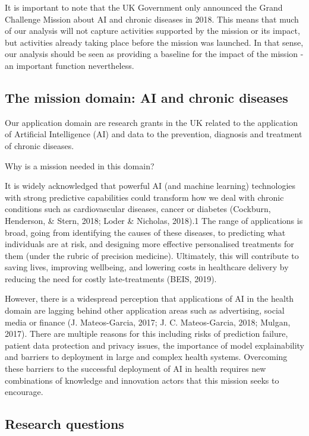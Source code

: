 \documentclass[11pt]{article}
\begin{document}
It is important to note that the UK Government only announced the Grand Challenge Mission about AI and chronic diseases in 2018. This means that much of our analysis will not capture activities supported by the mission or its impact, but activities already taking place before the mission was launched. In that sense, our analysis should be seen as providing a baseline for the impact of the mission - an important function nevertheless.

\subsection{The mission domain: AI and chronic diseases}
\label{subsec: domain}

Our application domain are research grants in the UK related to the application of Artificial Intelligence (AI) and data to the prevention, diagnosis and treatment of chronic diseases. 

Why is a mission needed in this domain? 

It is widely acknowledged that powerful AI (and machine learning) technologies with strong predictive capabilities could transform how we deal with chronic conditions such as cardiovascular diseases, cancer or diabetes (Cockburn, Henderson, \& Stern, 2018; Loder \& Nicholas, 2018).1 The range of applications is broad, going from identifying the causes of these diseases, to predicting what individuals are at risk, and designing more effective personalised treatments for them (under the rubric of precision medicine). Ultimately, this will contribute to saving lives, improving wellbeing, and lowering costs in healthcare delivery by reducing the need for costly late-treatments (BEIS, 2019).

However, there is a widespread perception that applications of AI in the health domain are lagging behind other application areas such as advertising, social media or finance (J. Mateos-Garcia, 2017; J. C. Mateos-Garcia, 2018; Mulgan, 2017). There are multiple reasons for this including risks of prediction failure, patient data protection and privacy issues, the importance of model explainability and barriers to deployment in large and complex health systems. Overcoming these barriers to the successful deployment of AI in health requires new combinations of knowledge and innovation actors that this mission seeks to encourage.

\subsection{Research questions}
\label{subsec: questions}
\end{document}
